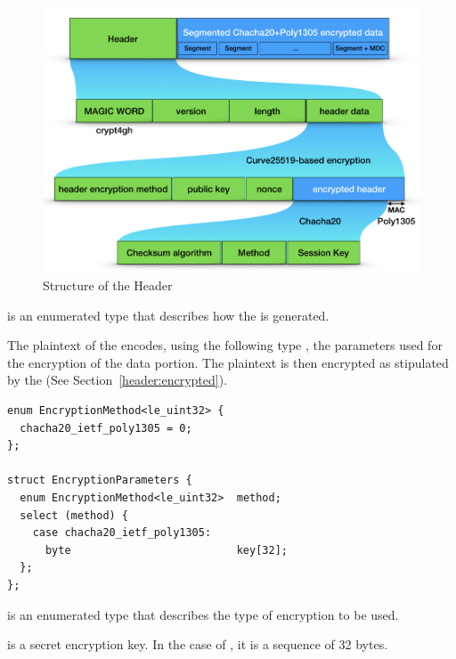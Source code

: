 \begin{figure}
 \centering
 \includegraphics[width=\textwidth]{sections/encryption.png}
 \caption{Structure of the Header}
 \label{figure:header:structure}
\end{figure}


 is an enumerated type that describes how the  is generated.

The plaintext of the  encodes, using the following type , the parameters used for the encryption of the data portion.
%
The plaintext is then encrypted as stipulated by the  (See Section~\ref{header:encrypted}).

\begin{verbatim}
enum EncryptionMethod<le_uint32> {
  chacha20_ietf_poly1305 = 0;
};

struct EncryptionParameters {
  enum EncryptionMethod<le_uint32>  method;
  select (method) {
    case chacha20_ietf_poly1305:
      byte                          key[32];
  };
};
\end{verbatim}

 is an enumerated type that describes the type of encryption to be used.

 is a secret encryption key.
%
In the case of , it is a sequence of 32 bytes.



